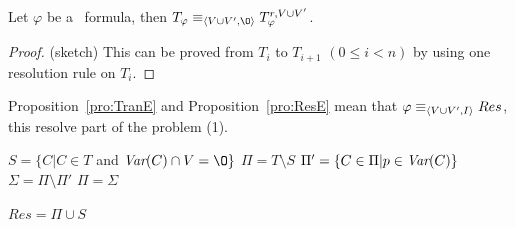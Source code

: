 \documentclass[letterpaper]{article} %
\begin{document}
\begin{proposition}\label{pro:ResE}
 Let $\varphi$ be a \CTL\ formula, then $T_{\varphi} \equiv_{\tuple{V \cup V', {\O}}} T_{\varphi}^{r,V \cup V'}$.
\end{proposition}
\begin{proof}(sketch)
This can be proved from $T_i$ to $T_{i+1}$ $(0\leq i < n)$ by using one resolution rule on $T_i$.
%
%
%
%
%
%
%

\end{proof}
Proposition~\ref{pro:TranE} and Proposition~\ref{pro:ResE} mean that $\varphi \equiv_{{\langle{V \cup V', I}\rangle}} Res$, this resolve part of the problem (1).

\begin{algorithm}[!h]
\caption{$\emph{Resolution}(T, V')$}%
\label{alg:compute:Res}

$S=\{C | C\in T$ and $\Var(C) \cap V= {\O}\}$\;
$\Pi=T\setminus S$ \;
 {
    $\Pi'=\{C \in \Pi| p\in \textit{Var}(C)\}$ \;
    $\Sigma = \Pi \setminus \Pi'$\;
     {
    }
    $\Pi= \Sigma$\;
}

$Res=\Pi \cup S$\;

\end{algorithm}
\end{document}

